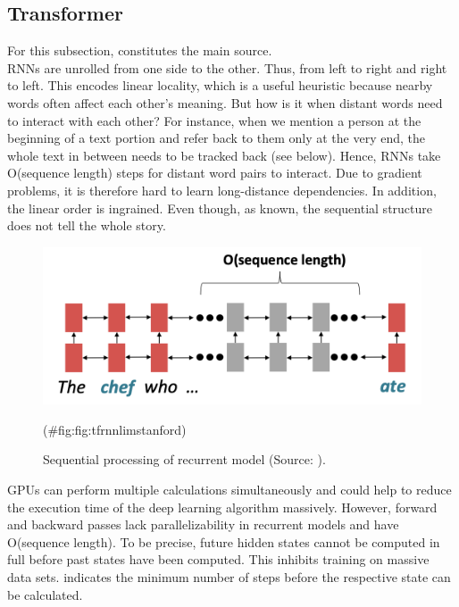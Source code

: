 \documentclass[
]{krantz}
\begin{document}
\hypertarget{transformer}{%
\subsection{Transformer}\label{transformer}}

For this subsection, \citep{Manning2022} constitutes the main source.\\
RNNs are unrolled from one side to the other. Thus, from left to right
and right to left. This encodes linear locality, which is a useful
heuristic because nearby words often affect each other's meaning. But
how is it when distant words need to interact with each other? For
instance, when we mention a person at the beginning of a text portion
and refer back to them only at the very end, the whole text in between
needs to be tracked back (see below). Hence, RNNs take O(sequence
length) steps for distant word pairs to interact. Due to gradient
problems, it is therefore hard to learn long-distance dependencies. In
addition, the linear order is ingrained. Even though, as known, the
sequential structure does not tell the whole story.

\begin{figure}

{\centering \includegraphics[width=0.7\linewidth]{./figures/01-01-nlp/transformer_rnnlim_stanford} 

}

\caption{Sequential processing of recurrent model (Source: \citet{Manning2022}).}(\#fig:fig:tfrnnlimstanford)
\end{figure}



GPUs can perform multiple calculations simultaneously and could help to
reduce the execution time of the deep learning algorithm massively.
However, forward and backward passes lack parallelizability in recurrent
models and have O(sequence length). To be precise, future hidden states
cannot be computed in full before past states have been computed. This
inhibits training on massive data sets. indicates the minimum number of
steps before the respective state can be calculated.
\end{document}
